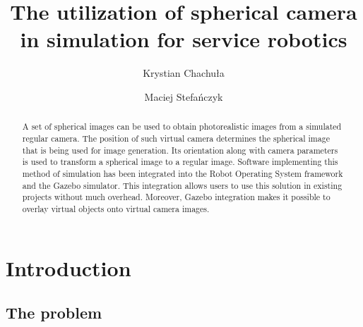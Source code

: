 \documentclass{svproc}
\begin{document}
\mainmatter

\title{The utilization of spherical camera in simulation for service robotics}

\author{Krystian Chachuła \and Maciej Stefańczyk}


\maketitle

\begin{abstract}
A set of spherical images can be used to obtain photorealistic images from a simulated regular camera.
The position of such virtual camera determines the spherical image that is being used for image generation.
Its orientation along with camera parameters is used to transform a spherical image to a regular image.
Software implementing this method of simulation has been integrated into the Robot Operating System framework and the Gazebo simulator. This integration allows users to use this solution in existing projects without much overhead.
Moreover, Gazebo integration makes it possible to overlay virtual objects onto virtual camera images.
\end{abstract}

\section{Introduction}

\subsection{The problem}
\end{document}
